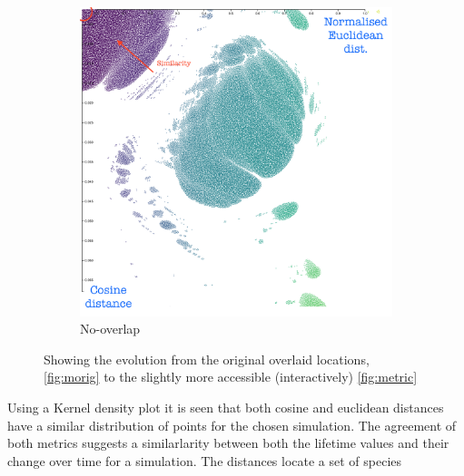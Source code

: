 \begin{figure}[H]
\begin{subfigure}[t]{.5\textwidth}
\includegraphics[width=\textwidth]{fig/metric.png}
\caption{No-overlap}
\label{fig:metric}
\end{subfigure}
\caption{Showing the evolution from the original overlaid locations, \autoref{fig:morig} to the slightly more accessible (interactively) \autoref{fig:metric}}
\end{figure}

Using a Kernel density plot it is seen that both cosine and euclidean distances have a similar distribution of points for the chosen simulation. The agreement of both metrics suggests a similarlarity between both the lifetime values and their change over time for a simulation. The distances locate a set of species
